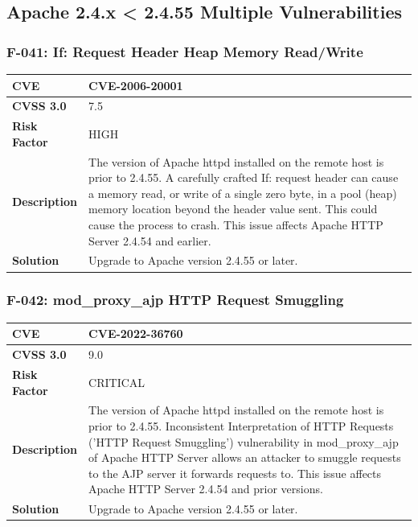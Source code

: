 %
%
\subsection{Apache 2.4.x < 2.4.55 Multiple Vulnerabilities}

\subsubsection{F-041: If: Request Header Heap Memory Read/Write}
\begin{tabular}{|p{2.8cm}|p{12.2cm}|}
\hline
\textbf{CVE} & CVE-2006-20001 \\ \hline
\textbf{CVSS 3.0} & 7.5 \\ \hline
\textbf{Risk Factor} & HIGH \\ \hline
\textbf{Description} & The version of Apache httpd installed on the remote host is prior to 2.4.55. A carefully crafted If: request header can cause a memory read, or write of a single zero byte, in a pool (heap) memory location beyond the header value sent. This could cause the process to crash. This issue affects Apache HTTP Server 2.4.54 and earlier. \\ \hline
\textbf{Solution} & Upgrade to Apache version 2.4.55 or later. \\ \hline
\end{tabular}

\subsubsection{F-042: mod\_proxy\_ajp HTTP Request Smuggling}
\begin{tabular}{|p{2.8cm}|p{12.2cm}|}
\hline
\textbf{CVE} & CVE-2022-36760 \\ \hline
\textbf{CVSS 3.0} & 9.0 \\ \hline
\textbf{Risk Factor} & CRITICAL \\ \hline
\textbf{Description} & The version of Apache httpd installed on the remote host is prior to 2.4.55. Inconsistent Interpretation of HTTP Requests ('HTTP Request Smuggling') vulnerability in mod\_proxy\_ajp of Apache HTTP Server allows an attacker to smuggle requests to the AJP server it forwards requests to. This issue affects Apache HTTP Server 2.4.54 and prior versions. \\ \hline
\textbf{Solution} & Upgrade to Apache version 2.4.55 or later. \\ \hline
\end{tabular}

